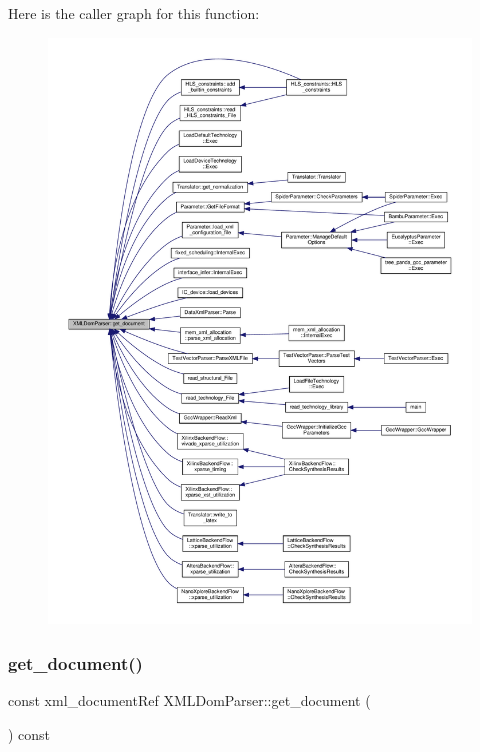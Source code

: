 Here is the caller graph for this function\+:
\nopagebreak
\begin{figure}[H]
\begin{center}
\leavevmode
\includegraphics[width=350pt]{d5/d7c/classXMLDomParser_a5099f463420bb3831a7fd13e004a3afb_icgraph}
\end{center}
\end{figure}
\mbox{\label{classXMLDomParser_aa985e702e37f9ca6885045154ef2f76a}} 
\subsubsection{\texorpdfstring{get\+\_\+document()}{get\_document()}\hspace{0.1cm}{\footnotesize\ttfamily [2/2]}}
{\footnotesize\ttfamily const xml\+\_\+document\+Ref X\+M\+L\+Dom\+Parser\+::get\+\_\+document (\begin{DoxyParamCaption}{ }\end{DoxyParamCaption}) const}



